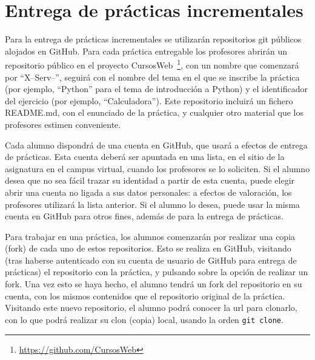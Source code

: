 

\section{Entrega de prácticas incrementales}
\label{sec:eje-entrega-practicas-incr}

Para la entrega de prácticas incrementales se utilizarán repositorios git públicos alojados en GitHub. Para cada práctica entregable los profesores abrirán un repositorio público en el proyecto CursosWeb~\footnote{\url{https://github.com/CursosWeb}}, con un nombre que comenzará por ``X--Serv--'', seguirá con el nombre del tema en el que se inscribe la práctica (por ejemplo, ``Python'' para el tema de introducción a Python) y el identificador del ejercicio (por ejemplo, ``Calculadora''). Este repositorio incluirá un fichero README.md, con el enunciado de la práctica, y cualquier otro material que los profesores estimen conveniente.

Cada alumno dispondrá de una cuenta en GitHub, que usará a efectos de entrega de prácticas. Esta cuenta deberá ser apuntada en una lista, en el sitio de la asignatura en el campus virtual, cuando los profesores se lo soliciten. Si el alumno desea que no sea fácil trazar su identidad a partir de esta cuenta, puede elegir abrir una cuenta no ligada a sus datos personales: a efectos de valoración, los profesores utilizará la lista anterior. Si el alumno lo desea, puede usar la misma cuenta en GitHub para otros fines, además de para la entrega de prácticas.

Para trabajar en una práctica, los alumnos comenzarán por realizar una copia (fork) de cada uno de estos repositorios. Esto se realiza en GitHub, visitando (tras haberse autenticado con su cuenta de usuario de GitHub para entrega de prácticas) el repositorio con la práctica, y pulsando sobre la opción de realizar un fork. Una vez esto se haya hecho, el alumno tendrá un fork del repositorio en su cuenta, con los mismos contenidos que el repositorio original de la práctica. Visitando este nuevo repositorio, el alumno podrá conocer la url para clonarlo, con lo que podrá realizar su clon (copia) local, usando la orden \verb|git clone|.

